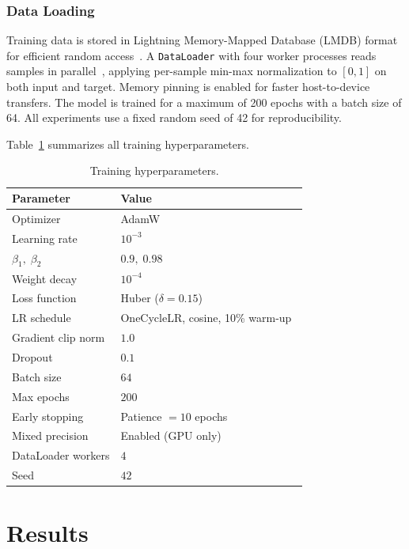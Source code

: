 \documentclass[12pt,a4paper]{report}
\begin{document}
\subsubsection{Data Loading}

Training data is stored in Lightning Memory-Mapped Database (LMDB) format for efficient random access~\cite{lmdb}.  A \texttt{DataLoader} with four worker processes reads samples in parallel~\cite{paszke2019}, applying per-sample min-max normalization to $[0,1]$ on both input and target.  Memory pinning is enabled for faster host-to-device transfers.  The model is trained for a maximum of 200 epochs with a batch size of 64.  All experiments use a fixed random seed of 42 for reproducibility.

Table~\ref{tab:training-params} summarizes all training hyperparameters.

\begin{table}[htbp]
  \centering
  \caption{Training hyperparameters.}
  \label{tab:training-params}
  \begin{tabular}{@{}ll@{}}
    \toprule
    \textbf{Parameter} & \textbf{Value} \\
    \midrule
    Optimizer          & AdamW~\cite{loshchilov2019} \\
    Learning rate      & $10^{-3}$ \\
    $\beta_1,\;\beta_2$ & $0.9,\;0.98$ \\
    Weight decay       & $10^{-4}$ \\
    Loss function      & Huber ($\delta=0.15$)~\cite{huber1964} \\
    LR schedule        & OneCycleLR, cosine, 10\% warm-up~\cite{smith2019} \\
    Gradient clip norm & $1.0$ \\
    Dropout            & $0.1$ \\
    Batch size         & $64$ \\
    Max epochs         & $200$ \\
    Early stopping     & Patience $= 10$ epochs \\
    Mixed precision    & Enabled (GPU only) \\
    DataLoader workers & $4$ \\
    Seed               & $42$ \\
    \bottomrule
  \end{tabular}
\end{table}

\section{Results}
\label{sec:results}
\end{document}
